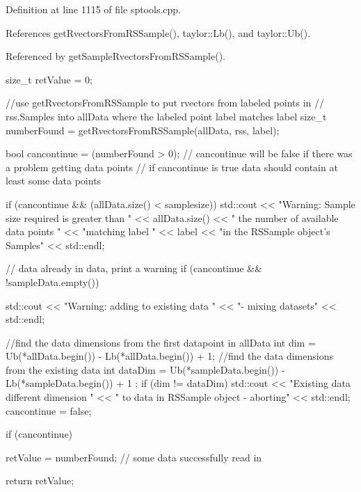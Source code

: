 \-Definition at line 1115 of file sptools.\-cpp.



\-References get\-Rvectors\-From\-R\-S\-Sample(), taylor\-::\-Lb(), and taylor\-::\-Ub().



\-Referenced by get\-Sample\-Rvectors\-From\-R\-S\-Sample().


\begin{DoxyCode}
    {

        size_t retValue = 0;

        //use getRvectorsFromRSSample to put rvectors from labeled points in
        // rss.Samples into allData where the labeled point label matches label
        size_t numberFound = getRvectorsFromRSSample(allData, rss, label);

        bool cancontinue = (numberFound > 0);
        // cancontinue will be false if there was a problem getting data points
        // if cancontinue is true data should contain at least some data points

        if (cancontinue && (allData.size() < samplesize)) {
            std::cout << "Warning: Sample size required is greater than "
                << allData.size() << " the number of available data points "
                << "matching label " << label << "in the RSSample object's
       Samples"
                << std::endl;
        }

        // data already in data, print a warning
        if (cancontinue && !sampleData.empty()) {
            std::cout
                << "Warning: adding to existing data "
                << "- mixing datasets"
                << std::endl;

             //find the data dimensions from the first datapoint in allData
            int dim = Ub(*allData.begin()) - Lb(*allData.begin()) + 1;
            //find the data dimensions from the existing data
            int dataDim = Ub(*sampleData.begin()) - Lb(*sampleData.begin()) + 1
      ;
            if (dim != dataDim) {
                std::cout
                    << "Existing data different dimension "
                    << " to data in RSSample object - aborting" << std::endl;
                cancontinue = false;
            }
        }

        if (cancontinue) {

            retValue = numberFound;    // some data successfully read in
        }

        return retValue;
    }
\end{DoxyCode}
